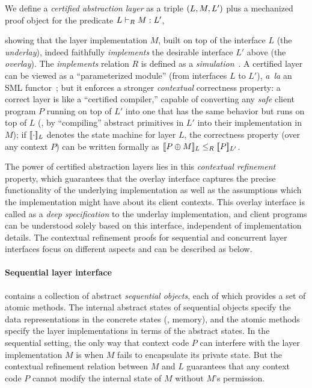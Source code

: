 We define a {\em certified abstraction
  layer} as a triple $\layer{L}{M}{L'}$ plus a mechanized
proof object for the predicate $\ltyp{L}{R}{M}{L'}$, 
showing that the layer
implementation $M$, built on top of the interface $L$ (the {\em
  underlay}), indeed faithfully {\em implements} the desirable
interface $L'$ above (the {\em overlay}).  The {\em implements}
relation $R$ is defined as a {\em simulation}~\cite{Lynch95}.
A certified layer can be
viewed as a ``parameterized module'' (from interfaces $L$ to $L'$),
{\em a~la} an SML functor~\cite{milner97};
 but it enforces a stronger {\em contextual} correctness property: a correct
layer is like a ``certified compiler,'' capable of converting any {\em
  safe} client program $P$ running on top of $L'$ into one that has the
same behavior but runs on top of $L$ (\eg, by ``compiling'' abstract
primitives in $L'$ into their implementation in $M$); if
$\sem{L}{\cdot}$ denotes the state machine for layer $L$, the
correctness property (over any context $P$) can be written formally as $\sem{L}{P\oplus{}M} \leq_R \sem{L'}{P}$.

The power of certified abstraction layers lies in 
this {\em contextual refinement}
property,
which guarantees that the overlay interface captures
the precise functionality of the underlying implementation as well as
the assumptions which the implementation might have about its client
contexts.
This overlay interface is called as
a {\em deep specification} 
to the underlay implementation,
and client programs can be understood solely based on this interface, independent of implementation details.
The contextual refinement proofs for sequential and concurrent
layer interfaces focus on different aspects
and can be described as below.


\paragraph{Sequential layer interface}
 contains a  collection of abstract 
\emph{sequential objects}, each of which provides a
set of atomic methods.
The internal abstract states of sequential objects
specify the data representations in the concrete states
(\eg, memory),
and the atomic methods
specify the layer implementations
in terms of the abstract states.
In the sequential setting, the only way that context code $P$ can 
 interfere with the 
layer implementation $M$ is when
$M$ fails to encapsulate its private state.
But the contextual refinement relation
between $M$ and $L$ guarantees that
any context code $P$ cannot
modify the internal state of $M$ 
without $M$'s permission.


